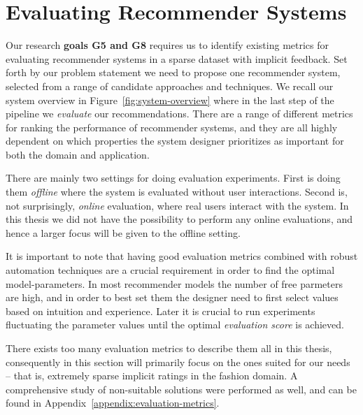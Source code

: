 \section{Evaluating Recommender Systems}
\label{sec:evaluation}

Our research \textbf{goals G5 and G8} requires us to identify existing metrics
for evaluating recommender systems in a sparse dataset with implicit feedback.
Set forth by our problem statement we need to propose one recommender system,
selected from a range of candidate approaches and techniques. We recall our
system overview in Figure~\ref{fig:system-overview} where in the last step of
the pipeline we \textit{evaluate} our recommendations. There are a range of
different metrics for ranking the performance of recommender systems, and they
are all highly dependent on which properties the system designer prioritizes as
important for both the domain and application.

There are mainly two settings for doing evaluation experiments. First is doing
them \textit{offline} where the system is evaluated without user interactions.
Second is, not surprisingly, \textit{online} evaluation, where real users
interact with the system. In this thesis we did not have the possibility to
perform any online evaluations, and hence a larger focus will be given to the
offline setting.

It is important to note that having good evaluation metrics combined with
robust automation techniques are a crucial requirement in order to find the
optimal model-parameters. In most recommender models the number of free
parmeters are high, and in order to best set them the designer need to first
select values based on intuition and experience. Later it is crucial to run
experiments fluctuating the parameter values until the optimal
\textit{evaluation score} is achieved.

There exists too many evaluation metrics to describe them all in this thesis,
consequently in this section will primarily focus on the ones suited for our
needs – that is, extremely sparse implicit ratings in the fashion domain. A
comprehensive study of non-suitable solutions were performed as well, and can
be found in Appendix~\ref{appendix:evaluation-metrics}.

